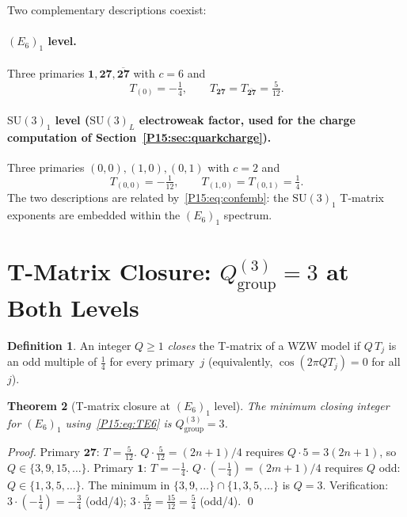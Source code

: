 \documentclass[11pt,a4paper]{article}
\newtheorem{theorem}{Theorem}[section]
\theoremstyle{definition}\newtheorem{definition}[theorem]{Definition}
\theoremstyle{remark}
\newcommand{\SU}{\mathrm{SU}}
\begin{document}
Two complementary descriptions coexist:

\paragraph{$(E_6)_1$ level.}
Three primaries $\mathbf{1},\mathbf{27},\overline{\mathbf{27}}$
with $c=6$ and
\begin{equation}
  T_{(0)} = -\tfrac{1}{4},\qquad
  T_{\mathbf{27}} = T_{\overline{\mathbf{27}}} = \tfrac{5}{12}.
  \label{P15:eq:TE6}
\end{equation}

\paragraph{$\SU(3)_1$ level ($\SU(3)_L$ electroweak factor, used for the charge computation of Section~\ref{P15:sec:quarkcharge}).}
Three primaries $(0,0),(1,0),(0,1)$ with $c=2$ and
\begin{equation}
  T_{(0,0)} = -\tfrac{1}{12},\qquad
  T_{(1,0)} = T_{(0,1)} = \tfrac{1}{4}.
  \label{P15:eq:TSU3}
\end{equation}
The two descriptions are related by~\eqref{P15:eq:confemb}:
the $\SU(3)_1$ T-matrix exponents are embedded within the
$(E_6)_1$ spectrum.

\section{T-Matrix Closure: $Q_{\mathrm{group}}^{(3)}=3$ at Both Levels}
\label{P15:sec:qgroup}

\begin{definition}
\label{P15:def:closes_tmatrix}
An integer $Q\geq 1$ \emph{closes} the T-matrix of a WZW model
if $Q\,T_j$ is an odd multiple of $\tfrac{1}{4}$ for every primary~$j$
(equivalently, $\cos(2\pi Q T_j)=0$ for all~$j$).
\end{definition}

\begin{theorem}[T-matrix closure at $(E_6)_1$ level]
\label{P15:thm:QgroupE6}
The minimum closing integer for $(E_6)_1$ using~\eqref{P15:eq:TE6} is
$Q_{\mathrm{group}}^{(3)}=3$.
\end{theorem}
\begin{proof}
Primary $\mathbf{27}$: $T=\tfrac{5}{12}$.
$Q\cdot\tfrac{5}{12}=(2n+1)/4$ requires $Q\cdot 5=3(2n+1)$,
so $Q\in\{3,9,15,\ldots\}$.
Primary $\mathbf{1}$: $T=-\tfrac{1}{4}$.
$Q\cdot(-\tfrac{1}{4})=(2m+1)/4$ requires $Q$ odd:
$Q\in\{1,3,5,\ldots\}$.
The minimum in $\{3,9,\ldots\}\cap\{1,3,5,\ldots\}$ is $Q=3$.
Verification: $3\cdot(-\tfrac{1}{4})=-\tfrac{3}{4}$ (odd/4);\;
$3\cdot\tfrac{5}{12}=\tfrac{15}{12}=\tfrac{5}{4}$ (odd/4).
\qed
\end{proof}
\end{document}
